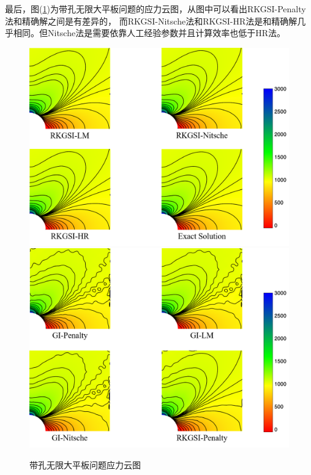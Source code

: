 最后，图(\ref{Hstress})为带孔无限大平板问题的应力云图，从图中可以看出RKGSI-Penalty法和精确解之间是有差异的，
而RKGSI-Nitsche法和RKGSI-HR法是和精确解几乎相同。但Nitsche法是需要依靠人工经验参数并且计算效率也低于HR法。
\begin{figure}[!h]
    \centering
    \includegraphics[scale=0.5]{figure/hole/hole.stress1.png}
    \includegraphics[scale=0.5]{figure/hole/hole.stress2.png}
    \caption{带孔无限大平板问题应力云图}\label{Hstress}
    \end{figure}\newpage

  


